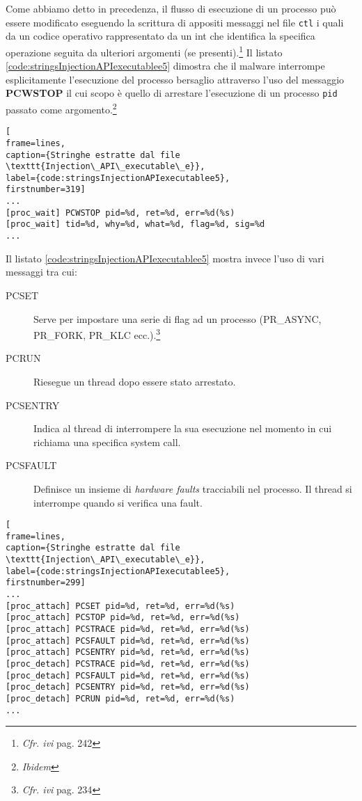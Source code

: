 \documentclass[10pt,a4paper, titlepage]{report}
\begin{document}
Come abbiamo detto in precedenza, il flusso di esecuzione di un processo può essere modificato eseguendo la scrittura di appositi messaggi nel file \texttt{ctl} i quali da un codice operativo rappresentato da un int che identifica la specifica operazione seguita da ulteriori argomenti (se presenti).\footnote{\textit{Cfr. ivi} pag. 242}
Il listato \ref{code:stringsInjectionAPIexecutablee5} dimostra che il malware interrompe esplicitamente l'esecuzione del processo bersaglio attraverso l'uso del messaggio \textbf{PCWSTOP} il cui scopo è quello di arrestare l'esecuzione di un processo \texttt{pid} passato come argomento.\footnote{\textit{Ibidem}}

\begin{lstlisting}[
frame=lines, 
caption={Stringhe estratte dal file \texttt{Injection\_API\_executable\_e}}, 
label={code:stringsInjectionAPIexecutablee5},
firstnumber=319]
...
[proc_wait] PCWSTOP pid=%d, ret=%d, err=%d(%s)
[proc_wait] tid=%d, why=%d, what=%d, flag=%d, sig=%d
...
\end{lstlisting}

Il listato \ref{code:stringsInjectionAPIexecutablee5} mostra invece l'uso di vari messaggi tra cui:
\begin{description}

\item[PCSET] Serve per impostare una serie di flag ad un processo (PR\_ASYNC, PR\_FORK, PR\_KLC ecc.).\footnote{\textit{Cfr. ivi} pag. 234} 
\item[PCRUN] Riesegue un thread dopo essere stato arrestato.
\item[PCSENTRY] Indica al thread di interrompere la sua esecuzione nel momento in cui richiama una specifica system call. 
\item[PCSFAULT] Definisce un insieme di \textit{hardware faults} tracciabili nel processo. Il thread si interrompe quando si verifica una fault.

\end{description}

\begin{lstlisting}[
frame=lines, 
caption={Stringhe estratte dal file \texttt{Injection\_API\_executable\_e}}, 
label={code:stringsInjectionAPIexecutablee5},
firstnumber=299]
...
[proc_attach] PCSET pid=%d, ret=%d, err=%d(%s)
[proc_attach] PCSTOP pid=%d, ret=%d, err=%d(%s)
[proc_attach] PCSTRACE pid=%d, ret=%d, err=%d(%s)
[proc_attach] PCSFAULT pid=%d, ret=%d, err=%d(%s)
[proc_attach] PCSENTRY pid=%d, ret=%d, err=%d(%s)
[proc_detach] PCSTRACE pid=%d, ret=%d, err=%d(%s)
[proc_detach] PCSFAULT pid=%d, ret=%d, err=%d(%s)
[proc_detach] PCSENTRY pid=%d, ret=%d, err=%d(%s)
[proc_detach] PCRUN pid=%d, ret=%d, err=%d(%s)
...
\end{lstlisting}
\end{document}
